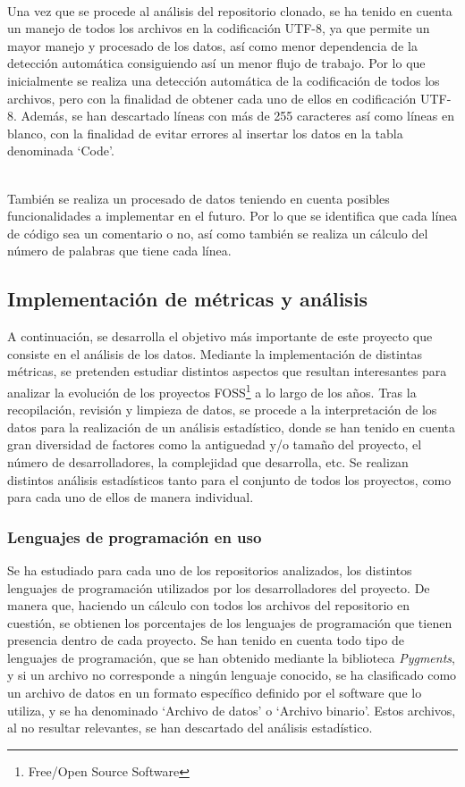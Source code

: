 \documentclass[a4paper, 12pt]{book}
\begin{document}
\\Una vez que se procede al análisis del repositorio clonado, se ha tenido en cuenta un manejo de todos los archivos en la codificación UTF-8, ya que permite un mayor manejo y procesado de los datos, así como menor dependencia de la detección automática consiguiendo así un menor flujo de trabajo.
Por lo que inicialmente se realiza una detección automática de la codificación de todos los archivos, pero con la finalidad de obtener cada uno de ellos en codificación UTF-8. Además, se han descartado líneas con más de 255 caracteres así como líneas en blanco, con la finalidad
de evitar errores al insertar los datos en la tabla denominada `Code'. 

\\También se realiza un procesado de datos teniendo en cuenta posibles funcionalidades a implementar en el futuro. Por lo que se identifica que cada línea de código sea un comentario o no, así como también se realiza un cálculo del número de palabras que tiene cada línea.

\subsection{Implementación de métricas y análisis}
\label{subsec:metricas}

A continuación, se desarrolla el objetivo más importante de este proyecto que consiste en el análisis de los datos. Mediante la implementación de distintas métricas, se pretenden estudiar distintos aspectos que resultan interesantes para analizar la evolución de los proyectos
FOSS\footnote{Free/Open Source Software} a lo largo de los años.
Tras la recopilación, revisión y limpieza de datos, se procede a la interpretación de los datos para la realización de un análisis estadístico, donde se han tenido en cuenta gran diversidad de factores como la antiguedad y/o tamaño del proyecto, el número de desarrolladores, la
complejidad que desarrolla, etc. Se realizan distintos análisis estadísticos tanto para el conjunto de todos los proyectos, como para cada uno de ellos de manera individual.

\subsubsection{Lenguajes de programación en uso}
\label{subsubsec:lenguajes}

Se ha estudiado para cada uno de los repositorios analizados, los distintos lenguajes de programación utilizados por los desarrolladores del proyecto. De manera que, haciendo un cálculo con todos los archivos del repositorio en cuestión, se obtienen los porcentajes de los lenguajes
de programación que tienen presencia dentro de cada proyecto. Se han tenido en cuenta todo tipo de lenguajes de programación, que se han obtenido mediante la biblioteca \textit{Pygments},  y si un archivo no corresponde a ningún lenguaje conocido, se ha clasificado como un archivo de
datos en un formato específico definido por el software que lo utiliza, y se ha denominado `Archivo de datos' o `Archivo binario'. Estos archivos, al no resultar relevantes, se han descartado del análisis estadístico.
\end{document}
